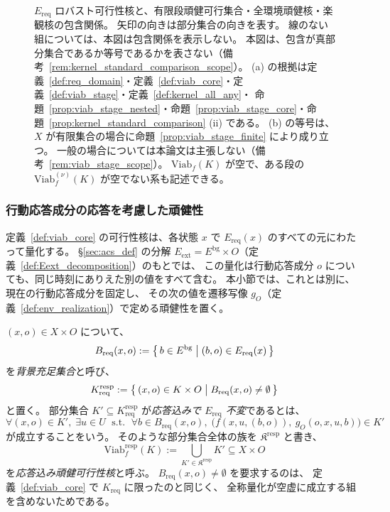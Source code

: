 \begin{figure}[tbp]
\caption{$E_{\mathrm{req}}$ ロバスト可行性核と、有限段頑健可行集合・全環境頑健核・楽観核の包含関係。
矢印の向きは部分集合の向きを表す。
線のない組については、本図は包含関係を表示しない。
本図は、包含が真部分集合であるか等号であるかを表さない（備考~\ref{rem:kernel_standard_comparison_scope}）。
(a) の根拠は定義~\ref{def:req_domain}・定義~\ref{def:viab_core}・定義~\ref{def:viab_stage}・定義~\ref{def:kernel_all_any}・
命題~\ref{prop:viab_stage_nested}・命題~\ref{prop:viab_stage_core}・命題~\ref{prop:kernel_standard_comparison} (ii) である。
(b) の等号は、$X$ が有限集合の場合に命題~\ref{prop:viab_stage_finite} により成り立つ。
一般の場合については本論文は主張しない（備考~\ref{rem:viab_stage_scope}）。
$\mathrm{Viab}_f(K)$ が空で、ある段の $\mathrm{Viab}_f^{(\nu)}(K)$ が空でない系も記述できる。}
\label{fig:s3_kernel_inclusion}
\end{figure}

\subsubsection{行動応答成分の応答を考慮した頑健性}

定義~\ref{def:viab_core} の可行性核は、各状態 $x$ で $E_{\mathrm{req}}(x)$ のすべての元にわたって量化する。
\S\ref{sec:acs_def} の分解 $E_{\mathrm{ext}}=E^{\mathrm{bg}}\times O$（定義~\ref{def:Eext_decomposition}）のもとでは、
この量化は行動応答成分 $o$ についても、同じ時刻にありえた別の値をすべて含む。
本小節では、これとは別に、現在の行動応答成分を固定し、
その次の値を遷移写像 $g_O$（定義~\ref{def:env_realization}）で定める頑健性を置く。

\begin{definition}
\label{def:viab_resp}
$(x,o)\in X\times O$ について、
\[
  B_{\mathrm{req}}(x,o)
  :=
  \bigl\{\,b\in E^{\mathrm{bg}}\bigm|(b,o)\in E_{\mathrm{req}}(x)\,\bigr\}
\]
を\emph{背景充足集合}と呼び、
\[
  K_{\mathrm{req}}^{\mathrm{resp}}
  :=
  \bigl\{\,(x,o)\in K\times O\bigm| B_{\mathrm{req}}(x,o)\neq\emptyset\,\bigr\}
\]
と置く。
部分集合 $K'\subseteq K_{\mathrm{req}}^{\mathrm{resp}}$ が\emph{応答込みで $E_{\mathrm{req}}$ 不変}であるとは、
\[
  \forall (x,o)\in K',\;
  \exists u\in U
  \;\text{ s.t. }\;
  \forall b\in B_{\mathrm{req}}(x,o),\;
  \bigl(f(x,u,(b,o)),\ g_O(o,x,u,b)\bigr)\in K'
\]
が成立することをいう。
そのような部分集合全体の族を $\mathfrak{K}^{\mathrm{resp}}$ と書き、
\[
  \mathrm{Viab}^{\mathrm{resp}}_f(K)
  :=
  \bigcup_{K'\in\mathfrak{K}^{\mathrm{resp}}}K'
  \subseteq X\times O
\]
を\emph{応答込み頑健可行性核}と呼ぶ。
$B_{\mathrm{req}}(x,o)\neq\emptyset$ を要求するのは、
定義~\ref{def:viab_core} で $K_{\mathrm{req}}$ に限ったのと同じく、
全称量化が空虚に成立する組を含めないためである。
\end{definition}

